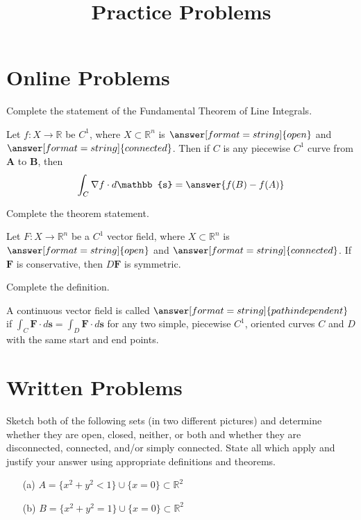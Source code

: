 \documentclass{ximera}
\title{Practice Problems}
\begin{document}
\begin{abstract}
\end{abstract}
\maketitle
\section{Online Problems}
\begin{problem}
Complete the statement of the Fundamental Theorem of Line Integrals.

Let $f:X\rightarrow\mathbb{R}$ be $C^1$, where $X\subset\mathbb{R}^n$ is $\answer[format=string]{open}$ and $\answer[format=string]{connected}$. Then if $C$ is any piecewise $C^1$ curve from $\mathbf{A}$ to $\mathbf{B}$, then
\[
\int_C\nabla f\cdot d\mathbb{s} = \answer{f(B)-f(A)}
\]
\end{problem}

\begin{problem}
Complete the theorem statement.

Let $F:X\rightarrow\mathbb{R}^n$ be a $C^1$ vector field, where $X\subset\mathbb{R}^n$ is $\answer[format=string]{open}$ and $\answer[format=string]{connected}$. If $\mathbf{F}$ is conservative, then $D\mathbf{F}$ is symmetric.
\end{problem}

\begin{problem}
Complete the definition.

A continuous vector field is called $\answer[format=string]{path independent}$ if $\int_C\mathbf{F}\cdot d\mathbf{s} = \int_D\mathbf{F}\cdot d\mathbf{s}$ for any two simple, piecewise $C^1$, oriented curves $C$ and $D$ with the same start and end points.
\end{problem}

\section{Written Problems}
\begin{problem}
Sketch both of the following sets (in two different pictures) and determine whether they are open, closed, neither, or both and whether they are disconnected, connected, and/or simply connected. State all which apply and justify your answer using appropriate definitions and theorems.
\begin{enumerate}
\item[(a)] $A=\{x^2+y^2<1\}\cup\{x=0\}\subset\mathbb{R}^2$
\item[(b)] $B=\{x^2+y^2=1\}\cup\{x=0\}\subset\mathbb{R}^2$
\end{enumerate}
\end{problem}
\end{document}
